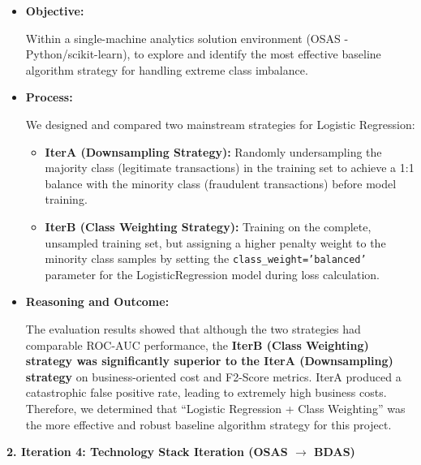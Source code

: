 \documentclass[sigplan,screen]{acmart}
\begin{document}
\begin{itemize}
\item \textbf{Objective:}

Within a single-machine analytics solution environment (OSAS - Python/scikit-learn), to explore and identify the most effective baseline algorithm strategy for handling extreme class imbalance.

\item \textbf{Process:}

We designed and compared two mainstream strategies for Logistic Regression:
\begin{itemize}
\item \textbf{IterA (Downsampling Strategy):} Randomly undersampling the majority class (legitimate transactions) in the training set to achieve a 1:1 balance with the minority class (fraudulent transactions) before model training.
\item \textbf{IterB (Class Weighting Strategy):} Training on the complete, unsampled training set, but assigning a higher penalty weight to the minority class samples by setting the \texttt{class\_\allowbreak weight=\allowbreak 'balanced'} parameter for the Logistic\allowbreak Regression model during loss calculation.
\end{itemize}

\item \textbf{Reasoning and Outcome:}

The evaluation results showed that although the two strategies had comparable ROC-AUC performance, the \textbf{IterB (Class Weighting) strategy was significantly superior to the IterA (Downsampling) strategy} on business-oriented cost and F2-Score metrics. IterA produced a catastrophic false positive rate, leading to extremely high business costs. Therefore, we determined that ``Logistic Regression + Class Weighting'' was the more effective and robust baseline algorithm strategy for this project.
\end{itemize}

\textbf{2. Iteration 4: Technology Stack Iteration (OSAS $\rightarrow$ BDAS)}
\end{document}
